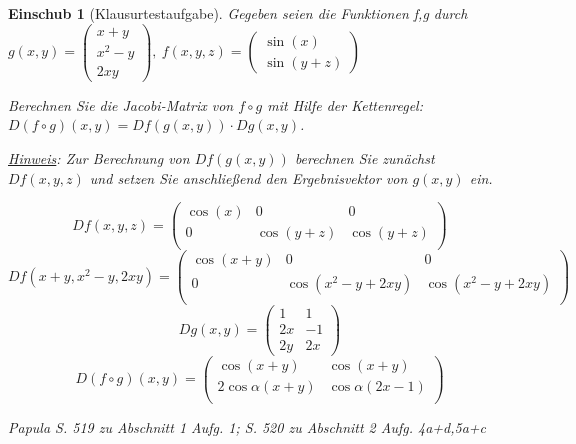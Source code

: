 \documentclass[fontset=ubuntu,12pt,a4paper]{scrreprt}
\newtheorem*{einschub}{Einschub}
\begin{document}
    \begin{einschub}[Klausurtestaufgabe]
        Gegeben seien die Funktionen f,g durch \(g(x,y)=\begin{pmatrix}
            x+y \\ x^2-y \\ 2xy
        \end{pmatrix},\ f(x,y,z)=\begin{pmatrix}
            \sin(x) \\ \sin(y+z)
        \end{pmatrix}\)

        Berechnen Sie die Jacobi-Matrix von \(f\circ g\) mit Hilfe der Kettenregel: \(D(f\circ g)(x,y)=Df(g(x,y))\cdot Dg(x,y)\).

        \underline{Hinweis}: Zur Berechnung von \(Df(g(x,y))\) berechnen Sie zunächst \(Df(x,y,z)\) und setzen Sie anschließend den Ergebnisvektor von \(g(x,y)\) ein.

        \[Df(x,y,z)=\begin{pmatrix}
            \cos(x) & 0 & 0 \\
            0 & \cos(y+z) & \cos(y+z) \\\end{pmatrix}\]
        \[Df(x+y,x^2-y,2xy)=\begin{pmatrix}
                \cos(x+y) & 0 & 0 \\
                0 & \cos(x^2-y+2xy) & \cos(x^2-y+2xy) \\\end{pmatrix}\]
        \[Dg(x,y)=\begin{pmatrix}
            1 & 1 \\
            2x & -1 \\
            2y & 2x\end{pmatrix}\]
        \[D(f\circ g)(x,y)=\begin{pmatrix}
            \cos(x+y) & \cos(x+y) \\
            2\cos\alpha(x+y) & \cos\alpha(2x-1) \\
        \end{pmatrix}\]

        Papula S. 519 zu Abschnitt 1 Aufg. 1; S. 520 zu Abschnitt 2 Aufg. 4a+d,5a+c
    \end{einschub}
\end{document}
